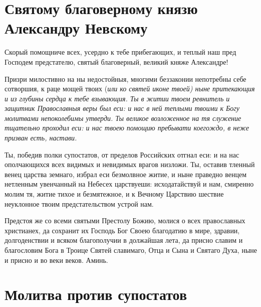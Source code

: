 

\label{_content_za-voinov}

 


 

\section{Святому благоверному князю Александру Невскому}
 




Скорый помощниче всех, усердно к тебе прибегающих, и теплый наш пред Господем предстателю, святый благоверный, великий княже Александре! 

Призри милостивно на ны недостойныя, многими беззаконии непотребны себе сотворшия, к раце мощей твоих (\itshape или\normalfont{} ко святей иконе твоей) ныне притекающия и из глубины сердца к тебе взывающия. Ты в житии твоем ревнитель и защитник Православныя веры был еси: и нас в ней теплыми твоими к Богу молитвами непоколебимы утверди. Ты великое возложенное на тя служение тщательно проходил еси: и нас твоею помощию пребывати коегождо, в неже призван есть, настави. 

Ты, победив полки супостатов, от пределов Российских отгнал еси: и на нас ополчающихся всех видимых и невидимых врагов низложи. Ты, оставив тленный венец царства земнаго, избрал еси безмолвное житие, и ныне праведно венцем нетленным увенчанный на Небесех царствуеши: исходатайствуй и нам, смиренно молим тя, житие тихое и безмятежное, и к Вечному Царствию шествие неуклонное твоим предстательством устрой нам. 

Предстоя же со всеми святыми Престолу Божию, молися о всех православных христианех, да сохранит их Господь Бог Своею благодатию в мире, здравии, долгоденствии и всяком благополучии в должайшая лета, да присно славим и благословим Бога в Троице Святей славимаго, Отца и Сына и Святаго Духа, ныне и присно и во веки веков. Аминь.

\section{Молитва против супостатов}
 



